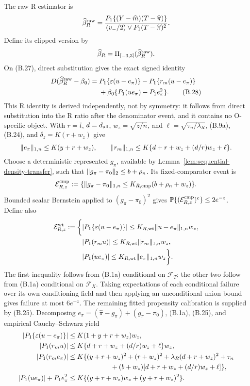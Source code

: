 The raw R estimator is
\[
 \widehat\beta_R^{\rm raw}
 =\frac{P_1\{(Y-\widehat m)(T-\widehat\pi)\}}
 {(v_-/2)\vee P_1(T-\widehat\pi)^2}.
\]
Define its clipped version by
\[
 \widehat\beta_R=\Pi_{[-3,3]}(\widehat\beta_R^{\rm raw}).
\]
On (B.27), direct substitution gives the exact signed identity
\begin{align}
 D(\widehat\beta_R^{\rm raw}-\beta_0)
 ={}&P_1\{\varepsilon(u-e_\pi)\}-P_1\{r_m(u-e_\pi)\}\nonumber\\
 &+\beta_0\{P_1(ue_\pi)-P_1e_\pi^2\}.
\tag{B.28}
\end{align}
This R identity is derived independently, not by symmetry: it follows from
direct substitution into the R ratio after the denominator event, and it
contains no O-specific object.
With \(r=\bar t\), \(d=d_{\rm all}\), \(w_z=\sqrt{z/n}\), and
\(\ell=\sqrt{\tau_n/\lambda_R}\), (B.9a), (B.24), and
\(\delta_z=K(r+w_z)\) give
\[
 \lVert e_\pi\rVert_{1,n}\le K(y+r+w_z),\qquad
 \lVert r_m\rVert_{1,n}\le
 K\{d+r+w_z+(d/r)w_z+\ell\}.
\]
Choose a deterministic represented \(g_\pi\), available by
Lemma~\ref{lem:sequential-density-transfer}, such that
\(\lVert g_\pi-\pi_0\rVert_2\le b+\rho_n\).  Its fixed-comparator event is
\[
 \mathcal E_{R,z}^{\rm cmp}:=
 \{\lVert g_\pi-\pi_0\rVert_{1,n}\le K_{R,\rm cmp}(b+\rho_n+w_z)\}.
\]
Bounded scalar Bernstein applied to \((g_\pi-\pi_0)^2\) gives
\(\mathbb P\{(\mathcal E_{R,z}^{\rm cmp})^c\}\le2e^{-z}\).  Define also
\[
\begin{split}
 \mathcal E_{R,z}^{\rm wt}:=\bigg\{&
 \lvert P_1\{\varepsilon(u-e_\pi)\}\rvert
 \le K_{R,\rm wt}\lVert u-e_\pi\rVert_{1,n} w_z,\\
 &\lvert P_1(r_m u)\rvert\le K_{R,\rm wt}\lVert r_m\rVert_{1,n} w_z,\\
 &\lvert P_1(ue_\pi)\rvert\le K_{R,\rm wt}\lVert e_\pi\rVert_{1,n} w_z\bigg\}.
\end{split}
\]
The first inequality follows from (B.1a) conditional on
\(\mathcal F_T\); the other two follow from (B.1a) conditional on
\(\mathcal F_X\).  Taking expectations of each conditional failure over
its own conditioning field and then applying an unconditional union bound
gives failure at most \(6e^{-z}\).  The remaining fitted propensity calibration is
supplied by (B.25).  Decomposing
\(e_\pi=(\widehat\pi-g_\pi)+(g_\pi-\pi_0)\), (B.1a), (B.25), and empirical
Cauchy--Schwarz yield
\begin{align*}
 \abs{P_1\{\varepsilon(u-e_\pi)\}}
  &\le K(1+y+r+w_z)w_z,\\
 \abs{P_1(r_mu)}
  &\le K\{d+r+w_z+(d/r)w_z+\ell\}w_z,\\
 \abs{P_1(r_me_\pi)}
  &\le K\{(y+r+w_z)^2+(r+w_z)^2
       +\lambda_R(d+r+w_z)^2+\tau_n\\
  &\hspace{22mm} +(b+w_z)[d+r+w_z+(d/r)w_z+\ell]\},\\
 \abs{P_1(ue_\pi)}+P_1e_\pi^2
  &\le K\{(y+r+w_z)w_z+(y+r+w_z)^2\}.
\end{align*}
